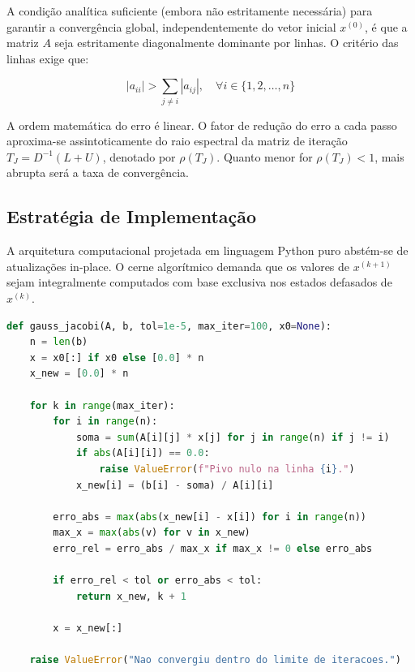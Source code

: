 A condição analítica suficiente (embora não estritamente necessária) para garantir a convergência global, independentemente do vetor inicial $x^{(0)}$, é que a matriz $A$ seja estritamente diagonalmente dominante por linhas. O critério das linhas exige que:

\begin{equation}
    |a_{ii}| > \sum_{j \neq i} |a_{ij}|, \quad \forall i \in \{1, 2, \dots, n\}
\end{equation}

A ordem matemática do erro é linear. O fator de redução do erro a cada passo aproxima-se assintoticamente do raio espectral da matriz de iteração $T_J = D^{-1}(L + U)$, denotado por $\rho(T_J)$. Quanto menor for $\rho(T_J) < 1$, mais abrupta será a taxa de convergência.

\subsection{Estratégia de Implementação}

A arquitetura computacional projetada em linguagem Python puro abstém-se de atualizações in-place. O cerne algorítmico demanda que os valores de $x^{(k+1)}$ sejam integralmente computados com base exclusiva nos estados defasados de $x^{(k)}$.

\begin{lstlisting}[language=Python, caption={Algoritmo Resumido do Método de Gauss-Jacobi}, label={lst:gauss_jacobi}]
def gauss_jacobi(A, b, tol=1e-5, max_iter=100, x0=None):
    n = len(b)
    x = x0[:] if x0 else [0.0] * n
    x_new = [0.0] * n
    
    for k in range(max_iter):
        for i in range(n):
            soma = sum(A[i][j] * x[j] for j in range(n) if j != i)
            if abs(A[i][i]) == 0.0:
                raise ValueError(f"Pivo nulo na linha {i}.")
            x_new[i] = (b[i] - soma) / A[i][i]
            
        erro_abs = max(abs(x_new[i] - x[i]) for i in range(n))
        max_x = max(abs(v) for v in x_new)
        erro_rel = erro_abs / max_x if max_x != 0 else erro_abs
        
        if erro_rel < tol or erro_abs < tol:
            return x_new, k + 1
            
        x = x_new[:]
        
    raise ValueError("Nao convergiu dentro do limite de iteracoes.")
\end{lstlisting}

